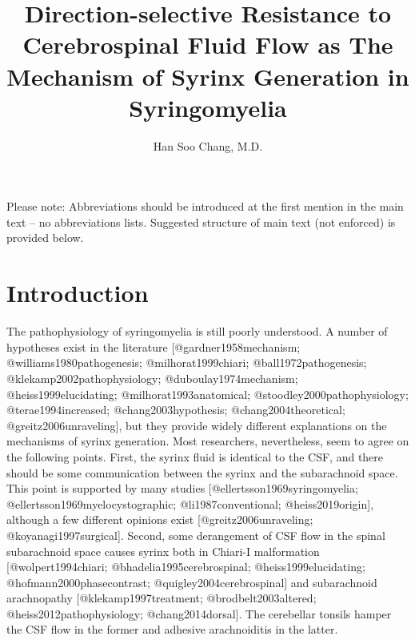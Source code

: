 \documentclass[fleqn,10pt]{wlscirep}
\title{Direction-selective Resistance to Cerebrospinal Fluid Flow as The
Mechanism of Syrinx Generation in Syringomyelia}
\author{Han Soo Chang, M.D.}
\affil{Department of Neurosurgery, Tokai University\\Isehara, Japan}
\begin{document}
\flushbottom
\maketitle
%
%
\thispagestyle{empty}

\noindent Please note: Abbreviations should be introduced at the first mention in the main text – no abbreviations lists. Suggested structure of main text (not enforced) is provided below.

\section*{Introduction}

The pathophysiology of syringomyelia is still poorly understood. A number
of hypotheses exist in the literature [@gardner1958mechanism;
@williams1980pathogenesis; @milhorat1999chiari; @ball1972pathogenesis;
@klekamp2002pathophysiology; @duboulay1974mechanism; @heiss1999elucidating;
@milhorat1993anatomical; @stoodley2000pathophysiology; @terae1994increased;
@chang2003hypothesis; @chang2004theoretical; @greitz2006unraveling], but
they provide widely different explanations on the mechanisms of syrinx
generation.  Most researchers, nevertheless, seem to agree on the following
points. First, the syrinx fluid is identical to the CSF, and there should
be some communication between the syrinx and the subarachnoid space. This
point is supported by many studies [@ellertsson1969syringomyelia;
@ellertsson1969myelocystographic; @li1987conventional; @heiss2019origin],
although a few different opinions exist [@greitz2006unraveling;
@koyanagi1997surgical]. Second, some derangement of CSF flow in the spinal
subarachnoid space causes syrinx both in Chiari-I malformation
[@wolpert1994chiari; @bhadelia1995cerebrospinal; @heiss1999elucidating;
@hofmann2000phasecontrast; @quigley2004cerebrospinal] and subarachnoid
arachnopathy [@klekamp1997treatment; @brodbelt2003altered;
@heiss2012pathophysiology; @chang2014dorsal]. The cerebellar tonsils hamper
the CSF flow in the former and adhesive arachnoiditis in the latter.
\end{document}
